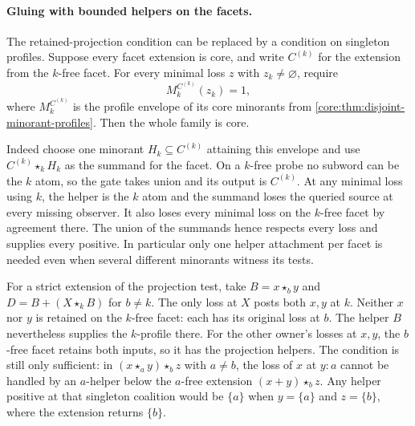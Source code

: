 \paragraph{Gluing with bounded helpers on the facets.}
The retained-projection condition can be replaced by
a condition on singleton profiles. Suppose every facet
extension is core, and write $C^{(k)}$ for the extension
from the $k$-free facet. For every minimal loss $z$ with
$z_k\ne\varnothing$, require
\[
                     M_k^{C^{(k)}}(z_k)=1,
\]
where $M_k^{C^{(k)}}$ is the profile envelope of its core
minorants from \cref{core:thm:disjoint-minorant-profiles}.
Then the whole family is core.

Indeed choose one minorant $H_k\subseteq C^{(k)}$
attaining this envelope and use
$C^{(k)}\star_k H_k$ as the summand for the facet.
On a $k$-free probe no subword can be the $k$ atom,
so the gate takes union and its output is $C^{(k)}$.
At any minimal loss using $k$, the helper is the $k$
atom and the summand loses the queried source at
every missing observer. It also loses every minimal
loss on the $k$-free facet by agreement there.
The union of the summands hence respects every loss and
supplies every positive. In particular only one helper
attachment per facet is needed even when several
different minorants witness its tests.

For a strict extension of the projection test, take
$B=x\star_b y$ and $D=B+(X\star_k B)$ for $b\ne k$.
The only loss at $X$ posts both $x,y$ at $k$.
Neither $x$ nor $y$ is retained on the $k$-free facet:
each has its original loss at $b$. The helper $B$
nevertheless supplies the $k$-profile there. For the
other owner's losses at $x,y$, the $b$-free facet
retains both inputs, so it has the projection helpers.
The condition is still only sufficient: in
$(x\star_a y)\star_b z$ with $a\ne b$, the loss of
$x$ at $y:a$ cannot be handled by an $a$-helper below
the $a$-free extension $(x+y)\star_b z$.
Any helper positive at that singleton coalition would
be $\{a\}$ when $y=\{a\}$ and $z=\{b\}$, where the
extension returns $\{b\}$.

